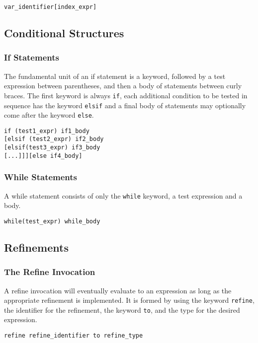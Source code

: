\begin{lstlisting}
var_identifier[index_expr]
\end{lstlisting}

\subsection{Conditional Structures}
\subsubsection{If Statements}
The fundamental unit of an if statement is a keyword, followed by a test expression between parentheses, and then a body of statements between curly braces. The first keyword is always \verb!if!, each additional condition to be tested in sequence has the keyword \verb!elsif! and a final body of statements may optionally come after the keyword \verb!else!.

\begin{lstlisting}
if (test1_expr) if1_body
[elsif (test2_expr) if2_body
[elsif(test3_expr) if3_body
[...]]][else if4_body]
\end{lstlisting}

\subsubsection{While Statements}
A while statement consists of only the \verb!while! keyword, a test expression and a body.

\begin{lstlisting}
while(test_expr) while_body
\end{lstlisting}

\subsection{Refinements}
\subsubsection{The Refine Invocation}
A refine invocation will eventually evaluate to an expression as long as the appropriate refinement is implemented. It is formed by using the keyword \verb!refine!, the identifier for the refinement, the keyword \verb!to!, and the type for the desired expression.

\begin{lstlisting}
refine refine_identifier to refine_type
\end{lstlisting}

